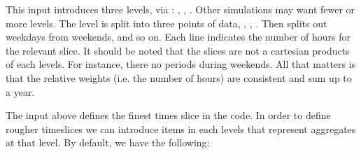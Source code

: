 \documentclass[letterpaper,10pt,english]{sphinxmanual}
\begin{document}
\begin{sphinxVerbatim}[commandchars=\\\{\}]
  
  
  
  
  
  
  
\end{sphinxVerbatim}

This input introduces three levels, via : , , .
Other simulations may want fewer or more levels.  The  level is split into
three points of data, , , . Then  splits out
weekdays from weekends, and so on. Each line indicates the number of hours for the
relevant slice. It should be noted that the slices are not a cartesian products of each
levels. For instance, there no  periods during weekends. All that matters is
that the relative weights (i.e. the number of hours) are consistent and sum up to a
year.

The input above defines the finest times slice in the code. In order to define rougher
timeslices we can introduce items in each levels that represent aggregates at that
level. By default, we have the following:

\begin{sphinxVerbatim}[commandchars=\\\{\}]
  
  
  
\end{sphinxVerbatim}
\end{document}
